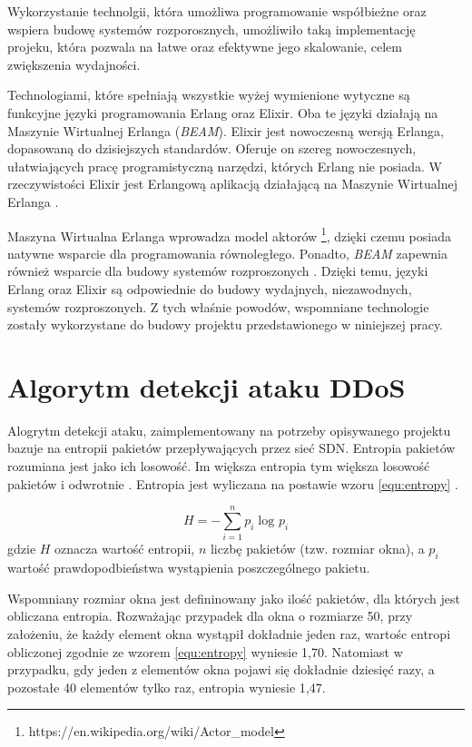 Wykorzystanie technolgii, która umożliwa programowanie współbieżne oraz wspiera
budowę systemów rozporosznych, umożliwiło taką implementację projeku, która
pozwala na łatwe oraz efektywne jego skalowanie, celem zwiększenia wydajności.

Technologiami, które spełniają wszystkie wyżej wymienione wytyczne są funkcyjne
języki programowania Erlang oraz Elixir. Oba te języki działają na Maszynie
Wirtualnej Erlanga (\textit{BEAM}). Elixir jest nowoczesną wersją
Erlanga, dopasowaną do dzisiejszych standardów. Oferuje on szereg nowoczesnych,
ułatwiających pracę programistyczną narzędzi, których Erlang nie posiada. W
rzeczywistości Elixir jest Erlangową aplikacją działającą na Maszynie Wirtualnej
Erlanga \cite{thebeambook}.

Maszyna Wirtualna Erlanga wprowadza model aktorów
\footnote{https://en.wikipedia.org/wiki/Actor\_model}, dzięki czemu posiada
natywne wsparcie dla programowania równoległego. Ponadto, \textit{BEAM} zapewnia
również wsparcie dla budowy systemów rozproszonych \cite{lyserlang}. Dzięki
temu, języki Erlang oraz Elixir są odpowiednie do budowy wydajnych,
niezawodnych, systemów rozproszonych. Z tych właśnie powodów, wspomniane
technologie zostały wykorzystane do budowy projektu przedstawionego w niniejszej
pracy.

\section{Algorytm detekcji ataku DDoS} \label{algorithm}

Alogrytm detekcji ataku, zaimplementowany na potrzeby opisywanego projektu
bazuje na entropii pakietów przepływających przez sieć SDN. Entropia pakietów
rozumiana jest jako ich losowość. Im większa entropia tym większa losowość
pakietów i odwrotnie \cite{mainddosarticle}. Entropia jest wyliczana na postawie
wzoru \ref{equ:entropy} \cite{mainddosarticle}.

\begin{equation}
H = -\sum_{i=1}^{n}p_{i}\log_{}p_{i}
\label{equ:entropy}
\end{equation}
gdzie $H$ oznacza wartość entropii, $n$ liczbę pakietów (tzw. rozmiar okna),
a $p_{i}$ wartość prawdopodbieństwa wystąpienia poszczególnego pakietu.

Wspomniany rozmiar okna jest defininowany jako ilość pakietów, dla których
jest obliczana entropia. Rozważając przypadek dla okna o rozmiarze 50, przy
założeniu, że każdy element okna wystąpił dokładnie jeden raz, wartośc entropi
obliczonej zgodnie ze wzorem \ref{equ:entropy} wyniesie 1,70. Natomiast w
przypadku, gdy jeden z elementów okna pojawi się dokładnie dziesięć razy, a
pozostałe 40 elementów tylko raz, entropia wyniesie 1,47.

